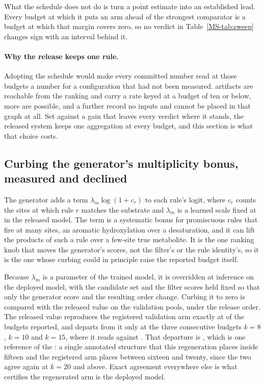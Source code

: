 \documentclass[journal=jcisd8,manuscript=suppinfo,layout=onecolumn]{achemso}
\begin{document}
What the schedule does not do is turn a point estimate into an established lead. Every budget at
which it puts an arm ahead of the strongest comparator is a budget at which that margin covers
zero, so no verdict in Table~\ref{MS-tab:sweep} changes sign with an interval behind it.

\paragraph{Why the release keeps one rule.} Adopting the schedule would make every committed
number read at those budgets a number for a configuration that had not been measured.
\numBlendRecompute{} artifacts are reachable from the ranking and carry a rate keyed at a budget
of ten or below, \numBlendRecomputepossible{} more are possible, and a further
\numBlendRecomputeunplaceable{} record no inputs and cannot be placed in that graph at all. Set
against a gain that leaves every verdict where it stands, the released system keeps one
aggregation at every budget, and this section is what that choice costs.

\subsection{Curbing the generator's multiplicity bonus, measured and declined}
\label{sec:si-matchscale}

The generator adds a term $\lambda_{m}\log(1+c_r)$ to each rule's logit, where $c_r$ counts the
sites at which rule $r$ matches the substrate and $\lambda_{m}$ is a learned scale fixed at
\numMatchscaleDeployed{} in the released model. The term is a systematic bonus for promiscuous
rules that fire at many sites, an aromatic hydroxylation over a desaturation, and it can lift the
products of such a rule over a few-site true metabolite. It is the one ranking knob that moves the
generator's scores, not the filter's or the rule identity's, so it is the one whose curbing
could in principle raise the reported budget itself.

Because $\lambda_{m}$ is a parameter of the trained model, it is overridden at inference on the
deployed model, with the candidate set and the filter scores held fixed so that only the generator
score and the resulting order change. Curbing it to zero is compared with the released value on the
validation pools, under the release order. The released value reproduces the registered
validation arm exactly at \numMatchscaleAgreebudgetsWord{} of the \numMatchscaleBudgetsWord{}
budgets reported, and departs from it only at the three consecutive budgets $k=8$, $k=10$ and
$k=15$, where it reads \numMatchscaleReprohere{} against \numMatchscaleRegistered{}. That departure
is \numMatchscaleReprodiff{}, which is one reference of the \numMatchscaleRefs{}: a single
annotated structure that this regeneration places inside fifteen and the registered arm places
between sixteen and twenty, since the two agree again at $k=20$ and above. Exact agreement
everywhere else is what certifies the regenerated arm is the deployed model.
\end{document}

